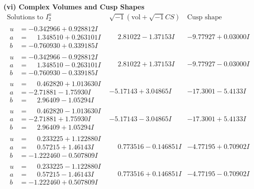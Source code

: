 \documentclass[1p]{elsarticle_modified}
\theoremstyle{definition}
\newcommand{\I}{\sqrt{-1}}
\begin{document}
\newpage\flushleft \textbf{(vi) Complex Volumes and Cusp Shapes}
$$\begin{array}{c|c|c}  
\text{Solutions to }I^u_{2}& \I (\text{vol} + \sqrt{-1}CS) & \text{Cusp shape}\\
 \hline 
\begin{aligned}
u &= -0.342966 + 0.928812 I \\
a &= \phantom{-}1.348510 + 0.263101 I \\
b &= -0.760930 + 0.339185 I\end{aligned}
 & \phantom{-}2.81022 - 1.37153 I & -9.77927 + 0.03000 I \\ \hline\begin{aligned}
u &= -0.342966 - 0.928812 I \\
a &= \phantom{-}1.348510 - 0.263101 I \\
b &= -0.760930 - 0.339185 I\end{aligned}
 & \phantom{-}2.81022 + 1.37153 I & -9.77927 - 0.03000 I \\ \hline\begin{aligned}
u &= \phantom{-}0.462820 + 1.013630 I \\
a &= -2.71881 - 1.75930 I \\
b &= \phantom{-}2.96409 - 1.05294 I\end{aligned}
 & -5.17143 + 3.04865 I & -17.3001 - 5.4133 I \\ \hline\begin{aligned}
u &= \phantom{-}0.462820 - 1.013630 I \\
a &= -2.71881 + 1.75930 I \\
b &= \phantom{-}2.96409 + 1.05294 I\end{aligned}
 & -5.17143 - 3.04865 I & -17.3001 + 5.4133 I \\ \hline\begin{aligned}
u &= \phantom{-}0.233225 + 1.122880 I \\
a &= \phantom{-}0.57215 + 1.46143 I \\
b &= -1.222460 - 0.507809 I\end{aligned}
 & \phantom{-}0.773516 - 0.146851 I & -4.77195 + 0.70902 I \\ \hline\begin{aligned}
u &= \phantom{-}0.233225 - 1.122880 I \\
a &= \phantom{-}0.57215 - 1.46143 I \\
b &= -1.222460 + 0.507809 I\end{aligned}
 & \phantom{-}0.773516 + 0.146851 I & -4.77195 - 0.70902 I \\ \hline\begin{aligned}

\end{aligned}
\end{array}$$
\end{document}
